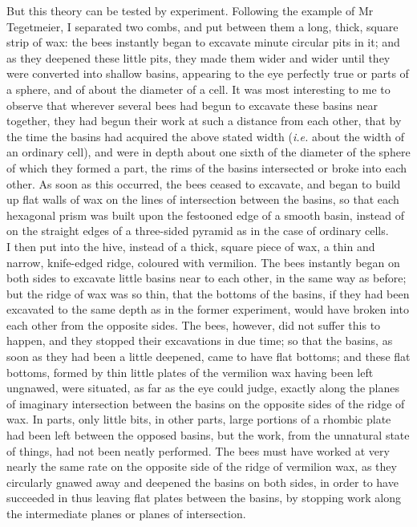 \indent But this theory can be tested by experiment. Following the example of Mr Tegetmeier, I separated two combs, and put between them a long, thick, square strip of wax: the bees instantly began to excavate minute circular pits in it; and as they deepened these little pits, they made them wider and wider until they were converted into shallow basins, appearing to the eye perfectly true or parts of a sphere, and of about the diameter of a cell. It was most interesting to me to observe that wherever several bees had begun to excavate these basins near together, they had begun their work at such a distance from each other, that by the time the basins had acquired the above stated width (\emph{i.e.} about the width of an ordinary cell), and were in depth about one sixth of the diameter of the sphere of which they formed a part, the rims of the basins intersected or broke into each other. As soon as this occurred, the bees ceased to excavate, and began to build up flat walls of wax on the lines of intersection between the basins, so that each hexagonal prism was built upon the festooned edge of a smooth basin, instead of on the straight edges of a three-sided pyramid as in the case of ordinary cells.\\
\indent I then put into the hive, instead of a thick, square piece of wax, a thin and narrow, knife-edged ridge, coloured with vermilion. The bees instantly began on both sides to excavate little basins near to each other, in the same way as before; but the ridge of wax was so thin, that the bottoms of the basins, if they had been excavated to the same depth as in the former experiment, would have broken into each other from the opposite sides. The bees, however, did not suffer this to happen, and they stopped their excavations in due time; so that the basins, as soon as they had been a little deepened, came to have flat bottoms; and these flat bottoms, formed by thin little plates of the vermilion wax having been left ungnawed, were situated, as far as the eye could judge, exactly along the planes of imaginary intersection between the basins on the opposite sides of the ridge of wax. In parts, only little bits, in other parts, large portions of a rhombic plate had been left between the opposed basins, but the work, from the unnatural state of things, had not been neatly performed.  The bees must have worked at very nearly the same rate on the opposite side of the ridge of vermilion wax, as they circularly gnawed away and deepened the basins on both sides, in order to have succeeded in thus leaving flat plates between the basins, by stopping work along the intermediate planes or planes of intersection.\\
